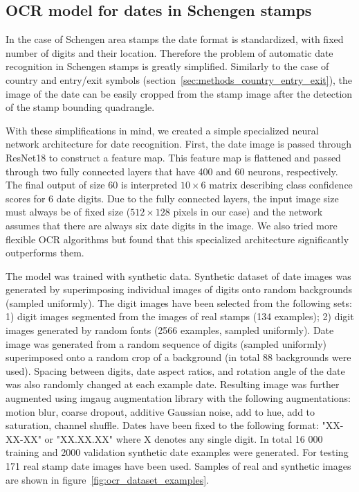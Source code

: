 \documentclass[twocolumn]{svjour3}
\begin{document}
\subsection{OCR model for dates in Schengen stamps}
\label{sec:methods_date_recognition}

In the case of Schengen area stamps the date format is standardized, with fixed number of digits and their location. Therefore the problem of automatic date recognition in Schengen stamps is greatly simplified. Similarly to the case of country and entry/exit symbols (section~\ref{sec:methods_country_entry_exit}), the image of the date can be easily cropped from the stamp image after the detection of the stamp bounding quadrangle.

With these simplifications in mind, we created a simple specialized neural network architecture for date recognition. First, the date image is passed through ResNet18 to construct a feature map. This feature map is flattened and passed through two fully connected layers that have 400 and 60 neurons, respectively. The final output of size 60 is interpreted $10 \times 6$ matrix describing class confidence scores for 6 date digits. Due to the fully connected layers, the input image size must always be of fixed size ($512 \times 128$ pixels in our case) and the network assumes that there are always six date digits in the image. We also tried more flexible OCR algorithms but found that this specialized architecture significantly outperforms them.

The model was trained with synthetic data. Synthetic dataset of date images was generated by superimposing individual images of digits onto random backgrounds (sampled uniformly). The digit images have been selected from the following sets:
1) digit images segmented from the images of real stamps (134 examples);
2) digit images generated by random fonts (2566 examples, sampled uniformly).
Date image was generated from a random sequence of digits (sampled uniformly) superimposed onto a random crop of a background (in total 88 backgrounds were used). Spacing between digits, date aspect ratios, and rotation angle of the date was also randomly changed at each example date. Resulting image was further augmented using imgaug augmentation library \cite{imgaug} with the following augmentations: motion blur, coarse dropout, additive Gaussian noise, add to hue, add to saturation, channel shuffle. Dates have been fixed to the following format: "XX-XX-XX" or "XX.XX.XX" where X denotes any single digit. In total 16 000 training and  2000 validation synthetic date examples were generated.
For testing 171 real stamp date images have been used. Samples of real and synthetic images are shown in figure~\ref{fig:ocr_dataset_examples}.
\end{document}
